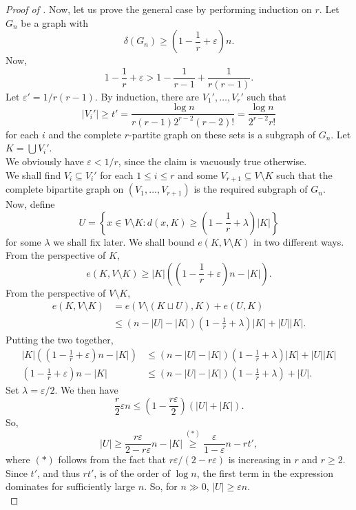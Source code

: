 \documentclass{article}
\begin{document}
\begin{proof}[Proof of ]
				Now, let us prove the general case by performing induction on $r$. Let $G_n$ be a graph with
				\[ \delta(G_n) \ge \left(1 - \frac{1}{r} + \varepsilon\right)n. \]
				Now,
				\[ 1 - \frac{1}{r} + \varepsilon > 1 - \frac{1}{r-1} + \frac{1}{r(r-1)}. \]
				Let $\varepsilon' = 1 / r(r-1)$. By induction, there are $V_1',\ldots,V_r'$ such that 
				\begin{equation}
					\label{eqn: ESS expression for t'}
					|V_i'| \ge t' = \frac{\log n}{r(r-1) 2^{r-2} (r-2)!} = \frac{\log n}{2^{r-2} r!}
				\end{equation}
				for each $i$ and the complete $r$-partite graph on these sets is a subgraph of $G_n$. Let $K = \bigcup V_i'$.\\
				We obviously have $\varepsilon < 1/r$, since the claim is vacuously true otherwise.\\
				We shall find $V_i \subseteq V_i'$ for each $1 \le i \le r$ and some $V_{r+1} \subseteq V \setminus K$ such that the complete bipartite graph on $(V_1,\ldots,V_{r+1})$ is the required subgraph of $G_n$.\\
				Now, define
				\[ U = \left\{x \in V\setminus K : d(x,K) \ge \left(1 - \frac{1}{r} + \lambda\right)|K| \right\} \]
				for some $\lambda$ we shall fix later. We shall bound $e(K,V\setminus K)$ in two different ways. From the perspective of $K$,
				\[ e(K,V\setminus K) \ge |K| \left(\left(1 - \frac{1}{r} + \varepsilon\right)n - |K|\right). \]
				From the perspective of $V\setminus K$,
				\begin{align*}
					e(K, V\setminus K) &= e(V\setminus (K\sqcup U), K) + e(U,K) \\
					&\le \left(n - |U| - |K|\right) \left(1 - \frac{1}{r} + \lambda\right)|K| + |U||K|.
				\end{align*}
				Putting the two together,
				\begin{align*}
					|K| \left(\left(1 - \frac{1}{r} + \varepsilon\right)n - |K|\right) &\le \left(n - |U| - |K|\right) \left(1 - \frac{1}{r} + \lambda\right)|K| + |U||K| \\
					\left(1 - \frac{1}{r} + \varepsilon\right)n - |K| &\le \left(n - |U| - |K|\right) \left(1 - \frac{1}{r} + \lambda\right) + |U|.
				\end{align*}
				Set $\lambda = \varepsilon/2$. We then have
				\[ \frac{r}{2}\varepsilon n \le \left(1 - \frac{r\varepsilon}{2}\right)(|U| + |K|). \]
				So,
				\[ |U| \ge \frac{r\varepsilon}{2 - r\varepsilon} n - |K| \stackrel{(*)}{\ge} \frac{\varepsilon}{1-\varepsilon}n - rt', \]
				where $(*)$ follows from the fact that $r\varepsilon/(2-r\varepsilon)$ is increasing in $r$ and $r\ge 2$.\\
				Since $t'$, and thus $rt'$, is of the order of $\log n$, the first term in the expression dominates for sufficiently large $n$. So, for $n\gg 0$, $|U| \ge \varepsilon n$.\\


\end{proof}
\end{document}
